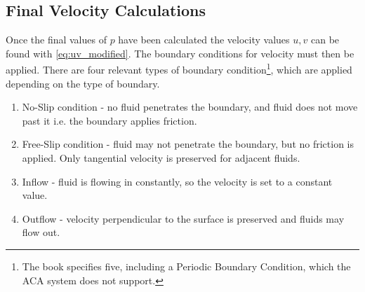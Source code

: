 \subsection{Final Velocity Calculations}
Once the final values of $p$ have been calculated the velocity values $u,v$ can be found with \cref{eq:uv_modified}.
The boundary conditions for velocity must then be applied.
There are four relevant types of boundary condition\footnote{The book specifies five, including a Periodic Boundary Condition, which the ACA system does not support.}, which are applied depending on the type of boundary.
\begin{enumerate}
    \item No-Slip condition - no fluid penetrates the boundary, and fluid does not move past it i.e. the boundary applies friction.
    \item Free-Slip condition - fluid may not penetrate the boundary, but no friction is applied. Only tangential velocity is preserved for adjacent fluids.
    \item Inflow - fluid is flowing in constantly, so the velocity is set to a constant value. 
    \item Outflow - velocity perpendicular to the surface is preserved and fluids may flow out.
\end{enumerate}

